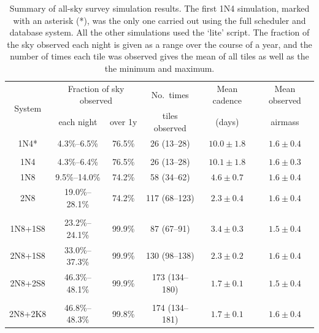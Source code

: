 \begin{colsection}
\begin{colsection}
\begin{table}[t]
    \begin{center}
        \begin{tabular}{c|cc|c|c|c} %
            \multirow{2}{*}{System} &
            \multicolumn{2}{c|}{Fraction of sky observed} &
            No.\ times &
            Mean cadence &
            Mean observed
            \\
            &
            each night &
            over 1y &
            tiles observed &
            (days) &
            airmass
            \\
            \midrule
            1N4* & 4.3\%--6.5\% & 76.5\% & 26 (13--28) & $10.0\pm1.8$ & $1.6\pm0.4$ \\
            &&&&&\\
            1N4 & 4.3\%--6.4\% & 76.5\% & 26 (13--28) & $10.1\pm1.8$ & $1.6\pm0.3$ \\
            1N8 & 9.5\%--14.0\% & 74.2\% & 58 (34--62) & $4.6\pm0.7$ & $1.6\pm0.4$ \\
            2N8 & 19.0\%--28.1\% & 74.2\% & 117 (68--123) & $2.3\pm0.4$ & $1.6\pm0.4$ \\
            &&&&&\\
            1N8+1S8 & 23.2\%--24.1\% & 99.9\% & 87 (67--91) & $3.4\pm0.3$ & $1.5\pm0.4$ \\
            2N8+1S8 & 33.0\%--37.3\% & 99.9\% & 130 (98--138) & $2.3\pm0.2$ & $1.6\pm0.4$ \\
            2N8+2S8 & 46.3\%--48.1\% & 99.9\% & 173 (134--180) & $1.7\pm0.1$ & $1.5\pm0.4$ \\
            &&&&&\\
            2N8+2K8 & 46.8\%--48.3\% & 99.8\% & 174 (134--181) & $1.7\pm0.1$ & $1.6\pm0.4$ \\
        \end{tabular}
    \end{center}
    \caption[All-sky survey simulation results summary table]{
        Summary of all-sky survey simulation results. The first 1N4 simulation, marked with an asterisk (*), was the only one carried out using the full scheduler and database system. All the other simulations used the `lite' script. The fraction of the sky observed each night is given as a range over the course of a year, and the number of times each tile was observed gives the mean of all tiles as well as the the minimum and maximum.
    }\label{tab:survey_sim_results}
\end{table}


\end{colsection}
\end{colsection}
